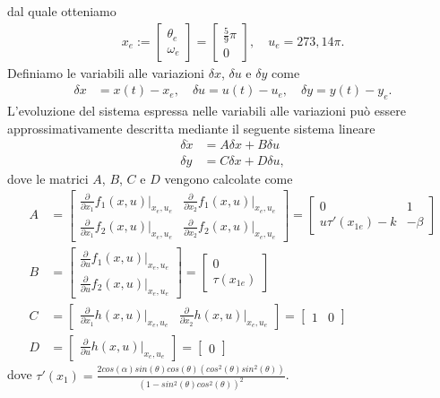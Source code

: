 \documentclass[a4paper, 11pt]{article}
\begin{document}
%
dal quale otteniamo
%
\begin{align}
	x_e := \begin{bmatrix}
		\theta_e \\
		\omega_e
	\end{bmatrix} = \begin{bmatrix}
		\frac{5}{9}\pi \\
		0
	\end{bmatrix},  \quad u_e = 273,14 \pi.\label{eq:equilibirum_pair}
\end{align}
%
Definiamo le variabili alle variazioni $\delta x$, $\delta u$ e $\delta y$ come 
%
\begin{align*}
	\delta x &= x(t) - x_e, 
	\quad
	\delta u = u(t) - u_e, 
	\quad
	\delta y = y(t) - y_e.
\end{align*}
%
L'evoluzione del sistema espressa nelle variabili alle variazioni pu\`o essere approssimativamente descritta mediante il seguente sistema lineare
%
\begin{subequations}\label{eq:linearized_system}
\begin{align}
	\delta \dot{x} &= A\delta x + B\delta u
	\\
	\delta y &= C\delta x + D\delta u,
\end{align}
\end{subequations}
%
dove le matrici $A$, $B$, $C$ e $D$ vengono calcolate come
%
\newcommand{\pdv}[2]{\frac{\partial}{\partial #1}#2(x,u)|_{x_e,u_e}}
\begin{subequations}\label{eq:matrices}
\begin{align}
	A &=\begin{bmatrix}
		\pdv{x_1}{f_1} & \pdv{x_2}{f_1} \\
		\pdv{x_1}{f_2} & \pdv{x_2}{f_2}
	\end{bmatrix} = \begin{bmatrix}
		0 & 1 \\
		u\tau'(x_{1e}) - k & - \beta
	\end{bmatrix}
	\\
	B &=\begin{bmatrix}
		\pdv{u}{f_1} \\
		\pdv{u}{f_2}
	\end{bmatrix} = \begin{bmatrix}
		0 \\
		\tau(x_{1e})
	\end{bmatrix}
	\\
	C &=\begin{bmatrix}
		\pdv{x_1}{h} & \pdv{x_2}{h}
	\end{bmatrix} = \begin{bmatrix}
		1 & 0
	\end{bmatrix}
	\\
	D &= \begin{bmatrix}
		\pdv{u}{h}
	\end{bmatrix} = \begin{bmatrix}
		0
	\end{bmatrix}
\end{align}
\end{subequations}
dove $\tau'(x_1)=\frac{2cos(\alpha)sin(\theta)cos(\theta)(cos^2(\theta)sin^2(\theta))}{(1-sin^2(\theta)cos^2(\theta))^2}$.
\end{document}
